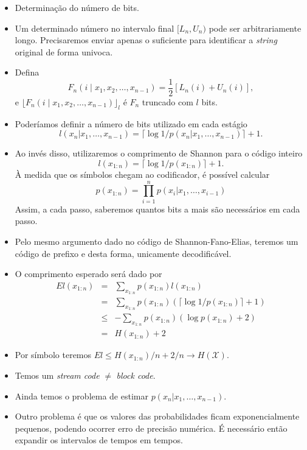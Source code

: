 \begin{frame}[allowframebreaks]
  \begin{itemize}
  \item Determinação do número de bits.
  \item Um determinado número no intervalo final $[L_n, U_n)$ pode ser arbitrariamente longo. 
	Precisaremos enviar apenas o suficiente para identificar a \textit{string} original de forma univoca. 
  \item Defina
	\begin{equation}
	F_n(i \mid x_1, x_2, \ldots, x_{n-1}) = \frac{1}{2} [L_n(i) + U_n(i)] ,
	\end{equation}
	e $\lfloor F_n(i \mid x_1, x_2, \ldots, x_{n-1}) \rfloor_{l}$ é $F_n$ truncado com $l$ bits.
  \item Poderíamos definir a número de bits utilizado em cada estágio
	\begin{equation}
	l(x_n | x_1, \ldots, x_{n-1}) = \lceil \log 1/p(x_n | x_1, \ldots, x_{n-1}) \rceil + 1 .
	\end{equation}
  \item Ao invés disso, utilizaremos o comprimento de Shannon para o código inteiro
	\begin{equation}
	l(x_{1:n}) = \lceil \log 1/p(x_{1:n}) \rceil + 1 .
        \end{equation}
	À medida que os símbolos chegam ao codificador, é possível calcular
	\begin{equation}
	p(x_{1:n}) = \prod_{i=1}^{n} p(x_i | x_1, \ldots, x_{i-1})
        \end{equation}
	Assim, a cada passo, saberemos quantos bits a mais são necessários em cada passo.
  \item Pelo mesmo argumento dado no código de Shannon-Fano-Elias, teremos um código de prefixo
	e desta forma, unicamente decodificável.
  \item O comprimento esperado será dado por
	\begin{eqnarray}
	E l(x_{1:n}) &=& \sum_{x_{1:n}} p(x_{1:n}) l(x_{1:n}) \nonumber \\
		&=& \sum_{x_{1:n}} p(x_{1:n}) \left( \lceil \log 1/p(x_{1:n}) \rceil + 1 \right) \nonumber \\
		&\leq& - \sum_{x_{1:n}} p(x_{1:n}) ( \log p(x_{1:n}) + 2 ) \nonumber \\
		&=& H(x_{1:n}) + 2
	\end{eqnarray}
  \item Por símbolo teremos $E l \leq H(x_{1:n})/n + 2/n \rightarrow H(\mathcal{X})$.
  \item Temos um \textit{stream code} $\neq$ \textit{block code}.
  \item Ainda temos o problema de estimar $p(x_n | x_1, \ldots, x_{n-1})$.
  \item Outro problema é que os valores das probabilidades ficam exponencialmente pequenos, podendo ocorrer erro de
	precisão numérica. É necessário então expandir os intervalos de tempos em tempos.
  \end{itemize}
\end{frame}


